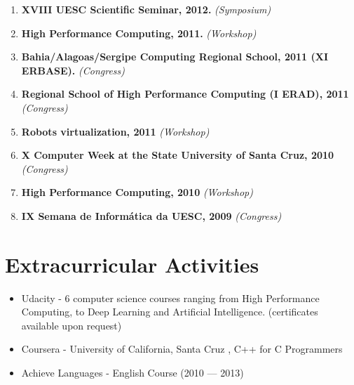 \documentclass[10pt, a4paper, oneside, final]{scrartcl} %
\begin{document}
\begin{enumerate}\itemsep1.5pt

\item \textbf{XVIII UESC Scientific Seminar, 2012.} \textit{(Symposium)}

\item \textbf{High Performance Computing, 2011.} \textit{(Workshop)}

\item \textbf{Bahia/Alagoas/Sergipe Computing Regional School, 2011 (XI ERBASE).}
 \textit{(Congress)}

\item \textbf{Regional School of High Performance Computing (I ERAD), 2011} \textit{(Congress)}

\item \textbf{Robots virtualization, 2011} \textit{(Workshop)}

\item \textbf{X Computer Week at the State University of Santa Cruz, 2010} \textit{(Congress)}

\item \textbf{High Performance Computing, 2010} \textit{(Workshop)}

\item \textbf{IX Semana de Informática da UESC, 2009} \textit{(Congress)}


\end{enumerate}


\section{Extracurricular Activities}
\begin{center}
\begin{itemize}\itemsep1.5pt
\item Udacity - 6 computer science courses ranging from High Performance Computing, to Deep Learning and Artificial Intelligence. (certificates available upon request)
\item Coursera - University of California, Santa Cruz , C++ for C Programmers
\item Achieve Languages - English Course (2010 --- 2013)

\end{itemize}
\end{center}
\end{document}
